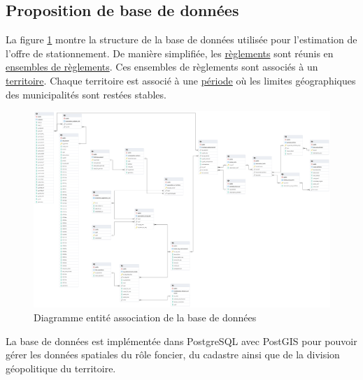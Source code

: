     \subsection{Proposition de base de données}
    La figure \ref{fig:offstreet_db_erd} montre la structure de la base de données utilisée pour l'estimation de l'offre de stationnement. De manière simplifiée, les \underline{règlements} sont réunis en \underline{ensembles de règlements}. Ces ensembles de règlements sont associés à un \underline{territoire}. Chaque territoire est associé à une \underline{période} où les limites géographiques des municipalités sont restées stables.
    \begin{landscape}
    \begin{figure}
        \centering
        \includegraphics[width = 0.85\linewidth]{images/structure_base_de_donnee.png}
        \caption{Diagramme entité association de la base de données}\label{fig:offstreet_db_erd}
    \end{figure}
    \end{landscape}
    La base de données est implémentée dans PostgreSQL avec PostGIS pour pouvoir gérer les données spatiales du rôle foncier, du cadastre ainsi que de la division géopolitique du territoire.\par


